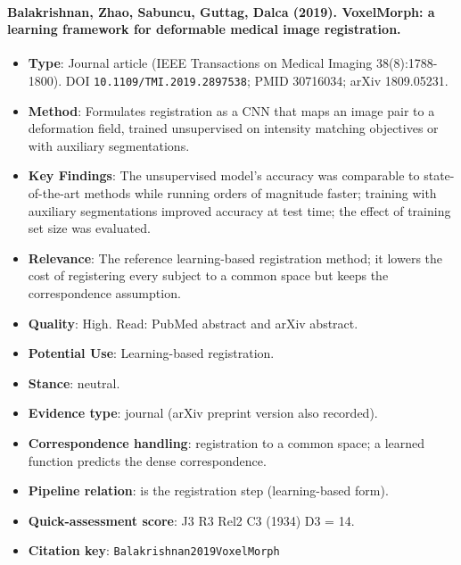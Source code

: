 \documentclass[journal,onecolumn]{IEEEtran}
\begin{document}
\paragraph{Balakrishnan, Zhao, Sabuncu, Guttag, Dalca (2019). VoxelMorph: a learning framework for deformable medical image registration.~\cite{Balakrishnan2019VoxelMorph}}\mbox{}

\begin{itemize}

\item{} \textbf{Type}: Journal article (IEEE Transactions on Medical Imaging 38(8):1788-1800). DOI \nolinkurl{10.1109/TMI.2019.2897538}; PMID 30716034; arXiv 1809.05231.

\item{} \textbf{Method}: Formulates registration as a CNN that maps an image pair to a deformation field, trained unsupervised on intensity matching objectives or with auxiliary segmentations.

\item{} \textbf{Key Findings}: The unsupervised model's accuracy was comparable to state-of-the-art methods while running orders of magnitude faster; training with auxiliary segmentations improved accuracy at test time; the effect of training set size was evaluated.

\item{} \textbf{Relevance}: The reference learning-based registration method; it lowers the cost of registering every subject to a common space but keeps the correspondence assumption.

\item{} \textbf{Quality}: High. Read: PubMed abstract and arXiv abstract.

\item{} \textbf{Potential Use}: Learning-based registration.

\item{} \textbf{Stance}: neutral.

\item{} \textbf{Evidence type}: journal (arXiv preprint version also recorded).

\item{} \textbf{Correspondence handling}: registration to a common space; a learned function predicts the dense correspondence.

\item{} \textbf{Pipeline relation}: is the registration step (learning-based form).

\item{} \textbf{Quick-assessment score}: J3 R3 Rel2 C3 (1934) D3 = 14.

\item{} \textbf{Citation key}: \texttt{Balakrishnan2019VoxelMorph}

\end{itemize}
\end{document}
